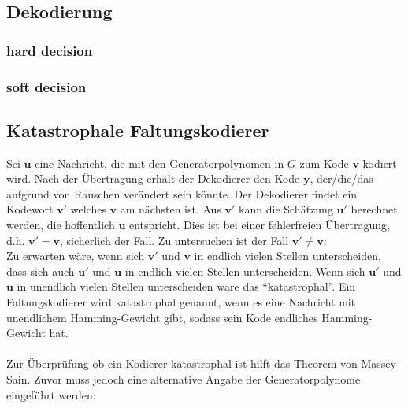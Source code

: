 \subsection{Dekodierung}
\label{kapitel:grundlagen_dekodierung}

\subsubsection{hard decision}
\label{kapitel:grundlagen_hard_decision}
\subsubsection{soft decision}
\label{kapitel:grundlagen_soft_decision}

\subsection{Katastrophale Faltungskodierer}
\label{kapitel:grundlagen_katastrophale_kodierer}
Sei $\mathbf{u}$ eine Nachricht, die mit den Generatorpolynomen in $G$ zum Kode $\mathbf{v}$ kodiert wird. Nach der Übertragung erhält der Dekodierer den Kode $\mathbf{y}$, der/die/das aufgrund von Rauschen verändert sein könnte. Der Dekodierer findet ein Kodewort $\mathbf{v'}$ welches $\mathbf{v}$ am nächsten ist. Aus $\mathbf{v'}$ kann die Schätzung $\mathbf{u'}$ berechnet werden, die hoffentlich $\mathbf{u}$ entspricht. Dies ist bei einer fehlerfreien Übertragung, d.h. $\mathbf{v'}=\mathbf{v}$, sicherlich der Fall. Zu untersuchen ist der Fall $\mathbf{v'}\neq\mathbf{v}$:\\
Zu erwarten wäre, wenn sich $\mathbf{v'}$ und $\mathbf{v}$ in endlich vielen Stellen unterscheiden, dass sich auch $\mathbf{u'}$ und $\mathbf{u}$ in endlich vielen Stellen unterscheiden. Wenn sich $\mathbf{u'}$ und $\mathbf{u}$ in unendlich vielen Stellen unterscheiden wäre das \enquote{katastrophal}. Ein Faltungskodierer wird katastrophal genannt, wenn es eine Nachricht mit unendlichem Hamming-Gewicht gibt, sodass sein Kode endliches Hamming-Gewicht hat. \cite[S. 569]{huffman2010fundamentals}
\\
\\
Zur Überprüfung ob ein Kodierer katastrophal ist hilft das Theorem von Massey-Sain. Zuvor muss jedoch eine alternative Angabe der Generatorpolynome eingeführt werden:

